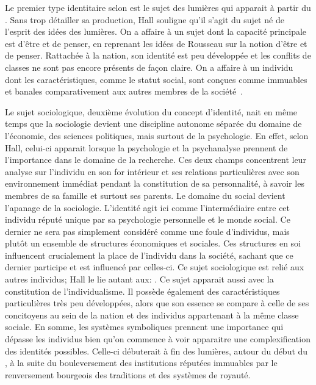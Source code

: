 Le premier type identitaire selon \citeauthor{Hall1996a} est le sujet des lumières qui apparait à partir du .
Sans trop détailler sa production, Hall souligne qu'il s'agit du sujet né de l'esprit des idées des lumières.
On a affaire à un sujet dont la capacité principale est d'être et de penser, en reprenant les idées de Rousseau sur la notion d'être et de penser.
Rattachée à la nation, son identité est peu développée et les conflits de classes ne sont pas encore présents de façon claire.
On a affaire à un individu dont les caractéristiques, comme le statut social, sont conçues comme immuables et banales comparativement aux autres membres de la société~\citeyearpar[596]{Hall1996a}.

Le sujet sociologique, deuxième évolution du concept d'identité, nait en même temps que la sociologie devient une discipline autonome séparée du domaine de l'économie, des sciences politiques, mais surtout de la psychologie.
En effet, selon Hall, celui-ci apparait lorsque la psychologie et la psychanalyse prennent de l'importance dans le domaine de la recherche.
Ces deux champs concentrent leur analyse sur l'individu en son for intérieur et ses relations particulières avec son environnement immédiat pendant la constitution de sa personnalité, à savoir les membres de sa famille et surtout ses parents.
Le domaine du social devient l'apanage de la sociologie.
L'identité agit ici comme l'intermédiaire entre cet individu réputé unique par sa psychologie personnelle et le monde social.
Ce dernier ne sera pas simplement considéré comme une foule d'individus, mais plutôt un ensemble de structures économiques et sociales.
Ces structures en soi influencent crucialement la place de l'individu dans la société, sachant que ce dernier participe et est influencé par celles-ci.
Ce sujet sociologique est relié aux autres individus; Hall le lie autant aux: .
Ce sujet apparait aussi avec la constitution de l'individualisme.
Il possède également des caractéristiques particulières très peu développées, alors que son essence se compare à celle de ses concitoyens au sein de la nation et des individus appartenant à la même classe sociale.
En somme, les systèmes symboliques prennent une importance qui dépasse les individus bien qu'on commence à voir apparaitre une complexification des identités possibles.
Celle-ci débuterait à fin des lumières, autour du début du , à la suite du bouleversement des institutions réputées immuables par le renversement bourgeois des traditions et des systèmes de royauté.

